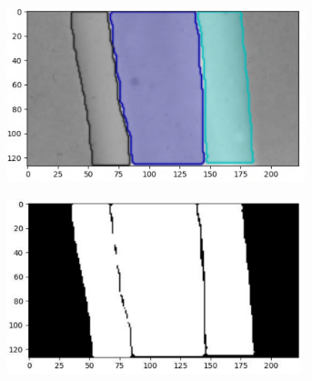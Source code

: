 \begin{figure}[ht]
    \centering
    \begin{subfigure}[b]{.40\linewidth}
    \centering
       \includegraphics[width=\linewidth, height=2in]{obrazky-figures/3regiony_segmenty.pdf}
        \caption{}\label{Detectron2-ROI-inference}
    \end{subfigure}
    \hspace{1em}
    \begin{subfigure}[b]{.40\linewidth}
    \centering
       \includegraphics[width=\linewidth, height=2in]{obrazky-figures/ROI_full_mask.pdf}
        \caption{}\label{Mask-ROI}
    \end{subfigure}\ContinuedFloat
    

\end{figure}
